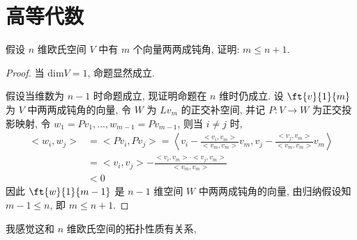 \chapter{高等代数}
    \begin{problem}
        假设 $n$ 维欧氏空间 $V$ 中有 $m$ 个向量两两成钝角, 证明: $m\leqslant n+1$.
    \end{problem}

    \begin{proof}
        当 $\mathrm{dim}V = 1$, 命题显然成立.

        假设当维数为 $n-1$ 时命题成立, 现证明命题在 $n$ 维时仍成立. 设 $\ft{v}{1}{m}$ 为 $V$ 中两两成钝角的向量, 
        令 $W$ 为 $Lv_m$ 的正交补空间, 并记 $P:V\rightarrow W$ 为正交投影映射, 令 $w_1=Pv_1,\dots,w_{m-1}=Pv_{m-1}$, 则当 $i\neq j$ 时, 
        \begin{align*}
            <w_i, w_j> &= <Pv_i,Pv_j> = \left<v_i-\frac{<v_i,v_m>}{<v_m,v_m>}v_m, v_j-\frac{<v_j,v_m>}{<v_m,v_m>}v_m\right> \\
            &=<v_i,v_j> - \frac{<v_i,v_m>\cdot<v_j,v_m>}{<v_m,v_m>} \\
            &<0
        \end{align*}
        因此 $\ft{w}{1}{m-1}$ 是 $n-1$ 维空间 $W$ 中两两成钝角的向量, 由归纳假设知 $m-1\leqslant n$, 即 $m\leqslant n+1$.
    \end{proof}
    \begin{remark}
        我感觉这和 $n$ 维欧氏空间的拓扑性质有关系, 
    \end{remark}